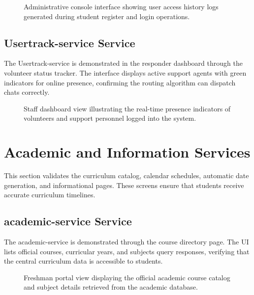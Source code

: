 \documentclass[12pt]{article}
\begin{document}
\begin{figure}[htbp]
    \centering
    \caption{Administrative console interface showing user access history logs generated during student register and login operations.}
    \label{fig:user_audit_logs}
\end{figure}

\subsection{Usertrack-service Service}
The Usertrack-service is demonstrated in the responder dashboard through the volunteer status tracker. The interface displays active support agents with green indicators for online presence, confirming the routing algorithm can dispatch chats correctly.

\begin{figure}[htbp]
    \centering
    \caption{Staff dashboard view illustrating the real-time presence indicators of volunteers and support personnel logged into the system.}
    \label{fig:volunteer_tracking}
\end{figure}

\section{Academic and Information Services}
This section validates the curriculum catalog, calendar schedules, automatic date generation, and informational pages. These screens ensure that students receive accurate curriculum timelines.

\subsection{academic-service Service}
The academic-service is demonstrated through the course directory page. The UI lists official courses, curricular years, and subjects query responses, verifying that the central curriculum data is accessible to students.

\begin{figure}[htbp]
    \centering
    \caption{Freshman portal view displaying the official academic course catalog and subject details retrieved from the academic database.}
    \label{fig:courses_catalog}
\end{figure}
\end{document}
